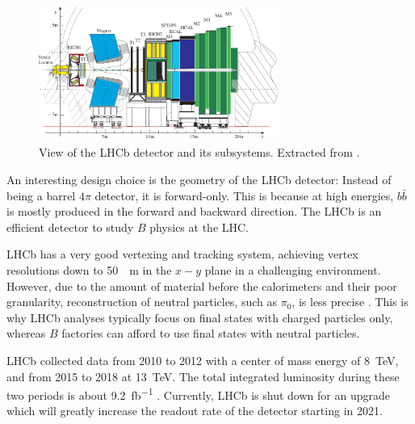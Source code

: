 \begin{figure}[ht]
    \centering
    \includegraphics[width=0.7\textwidth]{figs/lhcb_detector_view.pdf}
    \caption{
        View of the LHCb detector and its subsystems.
        Extracted from \cite{LHCb:2003ab}.
    }
    \label{fig:lhcb_detector_view}
\end{figure}

An interesting design choice is the geometry of the LHCb detector:
Instead of being a barrel $4\pi$ detector, it is forward-only.
This is because at high energies, $b\bar{b}$ is mostly produced in the forward
and backward direction.
The LHCb is an efficient detector to study $B$ physics at the LHC.

LHCb has a very good vertexing and tracking system, achieving vertex resolutions
down to \SI{50}{\mu m} in the $x-y$ plane in a challenging environment.
However, due to the amount of material before the calorimeters and their poor
granularity,
reconstruction of neutral particles, such as $\pi_0$, is less
precise \cite{LHCb:2008,Guz:2017}.
This is why LHCb analyses typically focus on final states with charged particles
only, whereas $B$ factories can afford to use final states with neutral
particles.

LHCb collected data from 2010 to 2012 with a center of mass energy of
\SI{8}{TeV}, and from 2015 to 2018 at \SI{13}{TeV}.
The total integrated luminosity during these two periods is about
\SI{9.2}{fb^{-1}} \cite{LHCb-Lumi:2019}.
Currently, LHCb is shut down for an upgrade which will greatly increase the
readout rate of the detector starting in 2021.

